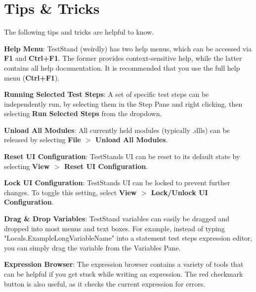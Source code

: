 \chapter{Tips \& Tricks }
\hypertarget{tips}{}\label{tips}
The following tips and tricks are helpful to know.


\begin{DoxyItemize}
\item {\bfseries{Help Menu}}:\+ Test\+Stand (weirdly) has two help menus, which can be accessed via {\bfseries{F1}} and {\bfseries{Ctrl+\+F1}}. The former provides context-\/sensitive help, while the latter contains all help documentation. It is recommended that you use the full help menu ({\bfseries{Ctrl+\+F1}}).
\item {\bfseries{Running Selected Test Steps}}:\+ A set of specific test steps can be independently run, by selecting them in the Step Pane and right clicking, then selecting {\bfseries{Run Selected Steps}} from the dropdown.
\item {\bfseries{Unload All Modules}}:\+ All currently held modules (typically .dlls) can be released by selecting {\bfseries{File \texorpdfstring{$>$}{>} Unload All Modules}}.
\item {\bfseries{Reset UI Configuration}}:\+ Test\+Stand\textquotesingle{}s UI can be reset to its default state by selecting {\bfseries{View \texorpdfstring{$>$}{>} Reset UI Configuration}}.
\item {\bfseries{Lock UI Configuration}}:\+ Test\+Stand\textquotesingle{}s UI can be locked to prevent further changes. To toggle this setting, select {\bfseries{View \texorpdfstring{$>$}{>} Lock/\+\+Unlock UI Configuration}}.
\item {\bfseries{Drag \& Drop Variables}}:\+ Test\+Stand variables can easily be dragged and dropped into most menus and text boxes. For example, instead of typing "{}\+Locals.\+Example\+Long\+Variable\+Name"{} into a statement test step\textquotesingle{}s expression editor, you can simply drag the variable from the Variables Pane.
\item {\bfseries{Expression Browser}}:\+ The expression browser contains a variety of tools that can be helpful if you get stuck while writing an expression. The red checkmark button is also useful, as it checks the current expression for errors. 
\end{DoxyItemize}